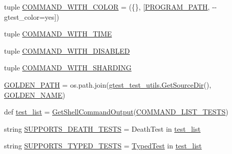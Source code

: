 \begin{DoxyCompactItemize}
\item 
tuple \mbox{\hyperlink{namespacegoogletest-output-test_ab4c3db724c6b581470a94b3118560a02}{C\+O\+M\+M\+A\+N\+D\+\_\+\+W\+I\+T\+H\+\_\+\+C\+O\+L\+OR}} = (\{\}, \mbox{[}\mbox{\hyperlink{namespacegoogletest-output-test_a36302384d49a636defe86704a422acb2}{P\+R\+O\+G\+R\+A\+M\+\_\+\+P\+A\+TH}}, \textquotesingle{}-\/-\/gtest\+\_\+color=yes\textquotesingle{}\mbox{]})
\item 
tuple \mbox{\hyperlink{namespacegoogletest-output-test_a748a138d54fa2c04f5ac4205ecc0e4e9}{C\+O\+M\+M\+A\+N\+D\+\_\+\+W\+I\+T\+H\+\_\+\+T\+I\+ME}}
\item 
tuple \mbox{\hyperlink{namespacegoogletest-output-test_a23aca1c76efbf8895d71a441c77a0225}{C\+O\+M\+M\+A\+N\+D\+\_\+\+W\+I\+T\+H\+\_\+\+D\+I\+S\+A\+B\+L\+ED}}
\item 
tuple \mbox{\hyperlink{namespacegoogletest-output-test_a7956407a07f884d3960e956ccb2571a6}{C\+O\+M\+M\+A\+N\+D\+\_\+\+W\+I\+T\+H\+\_\+\+S\+H\+A\+R\+D\+I\+NG}}
\item 
\mbox{\hyperlink{namespacegoogletest-output-test_aaf2c3cbfc15d83d986e1e2ba99a94a3e}{G\+O\+L\+D\+E\+N\+\_\+\+P\+A\+TH}} = os.\+path.\+join(\mbox{\hyperlink{namespacegtest__test__utils_aaff66cb0980804d8bd57dc719d4b5518}{gtest\+\_\+test\+\_\+utils.\+Get\+Source\+Dir}}(), \mbox{\hyperlink{namespacegoogletest-output-test_a66b45fb215424c968b479fbf864f1e7f}{G\+O\+L\+D\+E\+N\+\_\+\+N\+A\+ME}})
\item 
def \mbox{\hyperlink{namespacegoogletest-output-test_aa116be76cb5d1da2469f2811706bf08e}{test\+\_\+list}} = \mbox{\hyperlink{namespacegoogletest-output-test_aba640d7d1d0c51624f079baff79a04ab}{Get\+Shell\+Command\+Output}}(\mbox{\hyperlink{namespacegoogletest-output-test_accb05a0a5c9b083723186bb6116f928f}{C\+O\+M\+M\+A\+N\+D\+\_\+\+L\+I\+S\+T\+\_\+\+T\+E\+S\+TS}})
\item 
string \mbox{\hyperlink{namespacegoogletest-output-test_a3df1558c443e0307fa5a68ec1a698850}{S\+U\+P\+P\+O\+R\+T\+S\+\_\+\+D\+E\+A\+T\+H\+\_\+\+T\+E\+S\+TS}} = \textquotesingle{}Death\+Test\textquotesingle{} in \mbox{\hyperlink{namespacegoogletest-output-test_aa116be76cb5d1da2469f2811706bf08e}{test\+\_\+list}}
\item 
string \mbox{\hyperlink{namespacegoogletest-output-test_a20362e86a65972b4ca1d030daabb0485}{S\+U\+P\+P\+O\+R\+T\+S\+\_\+\+T\+Y\+P\+E\+D\+\_\+\+T\+E\+S\+TS}} = \textquotesingle{}\mbox{\hyperlink{classTypedTest}{Typed\+Test}}\textquotesingle{} in \mbox{\hyperlink{namespacegoogletest-output-test_aa116be76cb5d1da2469f2811706bf08e}{test\+\_\+list}}

\end{DoxyCompactItemize}
